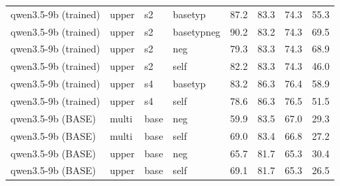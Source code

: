 \begin{table}[ht]
\begin{tabular}{llll rrrr}
\midrule
qwen3.5-9b (trained) & upper & s2 & basetyp & 87.2 & 83.3 & 74.3 & 55.3 \\
qwen3.5-9b (trained) & upper & s2 & basetypneg & 90.2 & 83.2 & 74.3 & 69.5 \\
qwen3.5-9b (trained) & upper & s2 & neg & 79.3 & 83.3 & 74.3 & 68.9 \\
qwen3.5-9b (trained) & upper & s2 & self & 82.2 & 83.3 & 74.3 & 46.0 \\
qwen3.5-9b (trained) & upper & s4 & basetyp & 83.2 & 86.3 & 76.4 & 58.9 \\
qwen3.5-9b (trained) & upper & s4 & self & 78.6 & 86.3 & 76.5 & 51.5 \\
\midrule
qwen3.5-9b (BASE) & multi & base & neg & 59.9 & 83.5 & 67.0 & 29.3 \\
qwen3.5-9b (BASE) & multi & base & self & 69.0 & 83.4 & 66.8 & 27.2 \\
\midrule
qwen3.5-9b (BASE) & upper & base & neg & 65.7 & 81.7 & 65.3 & 30.4 \\
qwen3.5-9b (BASE) & upper & base & self & 69.1 & 81.7 & 65.3 & 26.5 \\
\bottomrule
\end{tabular}
\end{table}
